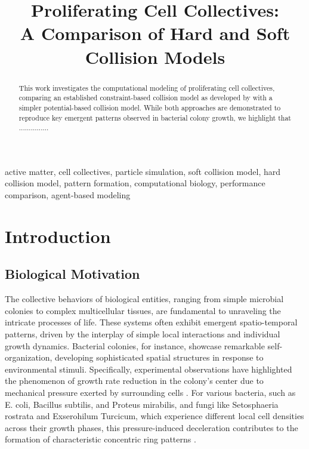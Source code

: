 \documentclass[conference]{IEEEtran}
\begin{document}
\title{Proliferating Cell Collectives: \\A Comparison of Hard and Soft Collision Models}

\author{
}

\maketitle

\begin{abstract}
    This work investigates the computational modeling of proliferating cell collectives, comparing an established constraint-based collision model as developed by \cite{Weady2024} with a simpler potential-based collision model. While both approaches are demonstrated to reproduce key emergent patterns observed in bacterial colony growth, we highlight that ...............

\end{abstract}

\begin{IEEEkeywords}
    active matter, cell collectives, particle simulation, soft collision model, hard collision model, pattern formation, computational biology, performance comparison, agent-based modeling
\end{IEEEkeywords}

\section{Introduction}
\subsection{Biological Motivation}

The collective behaviors of biological entities, ranging from simple microbial colonies to complex multicellular tissues, are fundamental to unraveling the intricate processes of life. These systems often exhibit emergent spatio-temporal patterns, driven by the interplay of simple local interactions and individual growth dynamics. Bacterial colonies, for instance, showcase remarkable self-organization, developing sophisticated spatial structures in response to environmental stimuli. Specifically, experimental observations have highlighted the phenomenon of growth rate reduction in the colony's center due to mechanical pressure exerted by surrounding cells \cite{Wittmann2023}. For various bacteria, such as E. coli, Bacillus subtilis, and Proteus mirabilis, and fungi like Setosphaeria rostrata and Exserohilum Turcicum, which experience different local cell densities across their growth phases, this pressure-induced deceleration contributes to the formation of characteristic concentric ring patterns \cite{YAMAZAKI2005136}.
\end{document}
